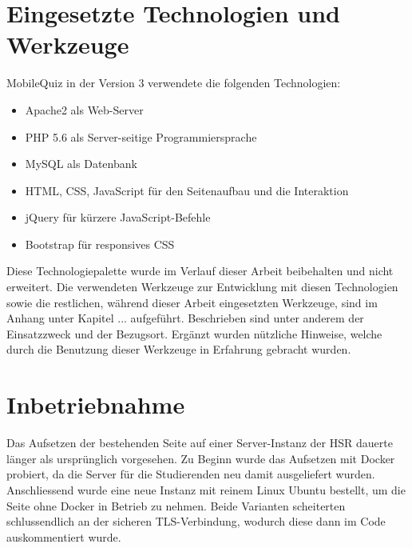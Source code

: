



\section{Eingesetzte Technologien und Werkzeuge}
MobileQuiz in der Version 3 verwendete die folgenden Technologien:

\begin{itemize}
	\item Apache2 als Web-Server
	\item PHP 5.6 als Server-seitige Programmiersprache
	\item MySQL als Datenbank
	\item HTML, CSS, JavaScript für den Seitenaufbau und die Interaktion
	\item jQuery für kürzere JavaScript-Befehle
	\item Bootstrap für \gls{responsives CSS}
\end{itemize}

Diese Technologiepalette wurde im Verlauf dieser Arbeit beibehalten und nicht erweitert. Die verwendeten Werkzeuge zur Entwicklung mit diesen Technologien sowie die restlichen, während dieser Arbeit eingesetzten Werkzeuge, sind im Anhang unter Kapitel ... aufgeführt. Beschrieben sind unter anderem der Einsatzzweck und der Bezugsort. Ergänzt wurden nützliche Hinweise, welche durch die Benutzung dieser Werkzeuge in Erfahrung gebracht wurden. 


\section{Inbetriebnahme}
Das Aufsetzen der bestehenden Seite auf einer Server-Instanz der HSR dauerte länger als ursprünglich vorgesehen. Zu Beginn wurde das Aufsetzen mit Docker probiert, da die Server für die Studierenden neu damit ausgeliefert wurden. Anschliessend wurde eine neue Instanz mit reinem Linux Ubuntu bestellt, um die Seite ohne Docker in Betrieb zu nehmen. Beide Varianten scheiterten schlussendlich an der sicheren \gls{TLS}-Verbindung, wodurch diese dann im Code auskommentiert wurde.

